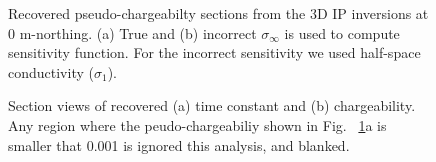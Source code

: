 \documentclass[extra,mreferee]{gji}
\newcommand{\siginf}{\sigma_\infty}
\begin{document}
\begin{figure}
  \caption{Recovered pseudo-chargeabilty sections from the 3D IP inversions at 0 m-northing.  (a) True and (b) incorrect $\siginf$ is used to compute sensitivity function. For the incorrect sensitivity we used half-space conductivity ($\sigma_1$).}
  \label{F:True_vs_approx_sensitivity}
\end{figure}

\begin{figure}
  \caption{Section views of recovered (a) time constant and (b) chargeability. Any region where the peudo-chargeabiliy shown in Fig. ~\ref{F:True_vs_approx_sensitivity}a is smaller that 0.001 is ignored this analysis, and blanked.}
  \label{F:EtaTauSection}
\end{figure}
\end{document}
